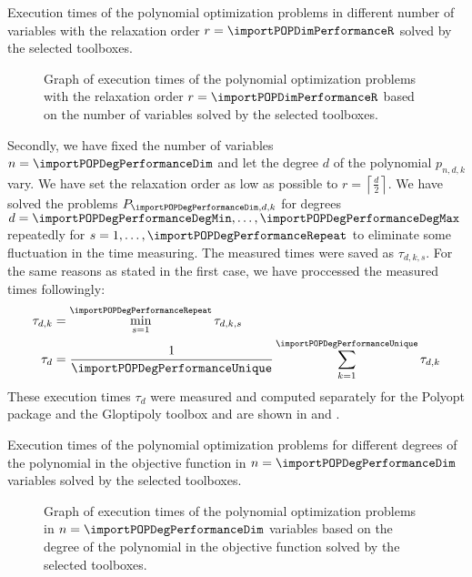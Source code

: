 \begin{table}[ht]
  \centering
  
  \caption{Execution times of the polynomial optimization problems in different number of variables with the relaxation order $r = \importPOPDimPerformanceR$ solved by the selected toolboxes.}
\end{table}

\begin{figure}[ht]
  \centering
  \resizebox{0.95\textwidth}{!}{}
  \caption{Graph of execution times of the polynomial optimization problems with the relaxation order $r = \importPOPDimPerformanceR$ based on the number of variables solved by the selected toolboxes.}
\end{figure}

Secondly, we have fixed the number of variables $n = \importPOPDegPerformanceDim$ and let the degree $d$ of the polynomial $p_{n,d,k}$ vary.
We have set the relaxation order as low as possible to $r = \left\lceil\frac{d}{2}\right\rceil$.
We have solved the problems $P_{\importPOPDegPerformanceDim,d,k}$ for degrees $d = \importPOPDegPerformanceDegMin, \ldots, \importPOPDegPerformanceDegMax$ repeatedly for $s = 1,\ldots, \importPOPDegPerformanceRepeat$ to eliminate some fluctuation in the time measuring.
The measured times were saved as $\tau_{d,k,s}$.
For the same reasons as stated in the first case, we have proccessed the measured times followingly:
\begin{align}
  \tau_{d,k} &= \min_{s=1}^{\importPOPDegPerformanceRepeat} \tau_{d,k,s}\\
  \tau_d &= \frac{1}{\importPOPDegPerformanceUnique}\sum_{k=1}^{\importPOPDegPerformanceUnique} \tau_{d,k}
\end{align}
These execution times $\tau_d$ were measured and computed separately for the Polyopt package and the Gloptipoly toolbox and are shown in  and .

\begin{table}[ht]
  \centering
  
  \caption{Execution times of the polynomial optimization problems for different degrees of the polynomial in the objective function in $n = \importPOPDegPerformanceDim$ variables solved by the selected toolboxes.}
\end{table}

\begin{figure}[ht]
  \centering
  \resizebox{0.95\textwidth}{!}{}
  \caption{Graph of execution times of the polynomial optimization problems in $n = \importPOPDegPerformanceDim$ variables based on the degree of the polynomial in the objective function solved by the selected toolboxes.}
\end{figure}

